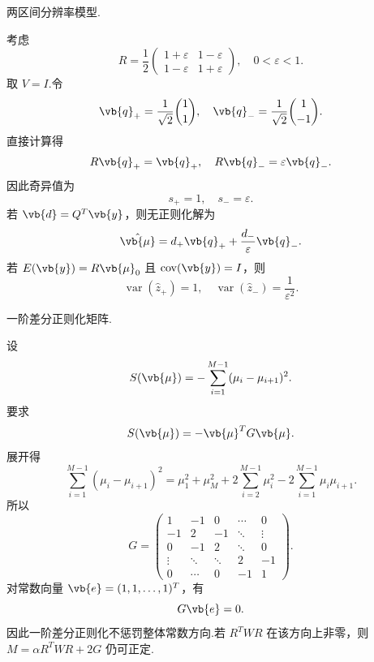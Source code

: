 \begin{example}
	两区间分辨率模型.

	考虑
	\begin{equation*}
		R=\frac{1}{2}
		\begin{pmatrix}
			1+\varepsilon & 1-\varepsilon\\
			1-\varepsilon & 1+\varepsilon
		\end{pmatrix},
		\quad 0<\varepsilon<1.
	\end{equation*}
	取 \(V=I\).令
	\begin{equation*}
		\vb{q}_+=\frac{1}{\sqrt{2}}\binom{1}{1},
		\quad
		\vb{q}_-=\frac{1}{\sqrt{2}}\binom{1}{-1}.
	\end{equation*}
	直接计算得
	\begin{equation*}
		R\vb{q}_+=\vb{q}_+,\quad R\vb{q}_-=\varepsilon\vb{q}_-.
	\end{equation*}
	因此奇异值为
	\begin{equation*}
		s_+=1,\quad s_-=\varepsilon.
	\end{equation*}
	若 \(\vb{d}=Q^T\vb{y}\)，则无正则化解为
	\begin{equation*}
		\hat{\vb{\mu}}
		=d_+\vb{q}_++\frac{d_-}{\varepsilon}\vb{q}_-.
	\end{equation*}
	若 \(E(\vb{y})=R\vb{\mu}_0\) 且 \(\operatorname{cov}(\vb{y})=I\)，则
	\begin{equation*}
		\operatorname{var}(\hat{z}_+)=1,\quad
		\operatorname{var}(\hat{z}_-)=\frac{1}{\varepsilon^2}.
	\end{equation*}
\end{example}

\begin{example}
	一阶差分正则化矩阵.

	设
	\begin{equation*}
		S(\vb{\mu})=-\sum_{i=1}^{M-1}(\mu_i-\mu_{i+1})^2.
	\end{equation*}
	要求
	\begin{equation*}
		S(\vb{\mu})=-\vb{\mu}^TG\vb{\mu}.
	\end{equation*}
	展开得
	\begin{equation*}
		\sum_{i=1}^{M-1}(\mu_i-\mu_{i+1})^2
		=\mu_1^2+\mu_M^2
		+2\sum_{i=2}^{M-1}\mu_i^2
		-2\sum_{i=1}^{M-1}\mu_i\mu_{i+1}.
	\end{equation*}
	所以
	\begin{equation*}
		G=
		\begin{pmatrix}
			1 & -1 & 0 & \cdots & 0\\
			-1 & 2 & -1 & \ddots & \vdots\\
			0 & -1 & 2 & \ddots & 0\\
			\vdots & \ddots & \ddots & 2 & -1\\
			0 & \cdots & 0 & -1 & 1
		\end{pmatrix}.
	\end{equation*}
	对常数向量 \(\vb{e}=(1,1,\ldots,1)^T\)，有
	\begin{equation*}
		G\vb{e}=0.
	\end{equation*}
	因此一阶差分正则化不惩罚整体常数方向.若 \(R^TWR\) 在该方向上非零，则 \(M=\alpha R^TWR+2G\) 仍可正定.
\end{example}
